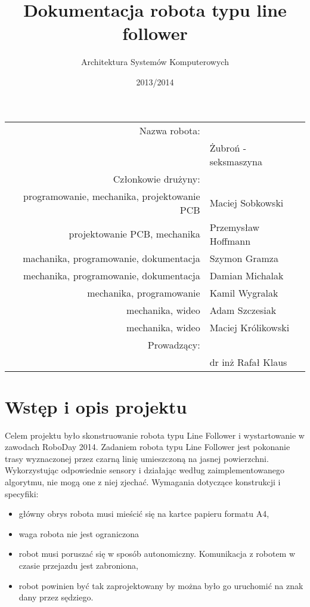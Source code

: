 \documentclass[11pt,a4paper]{article}
\author{Architektura Systemów Komputerowych}
\title{Dokumentacja robota typu line follower}
\date{2013/2014}
\begin{document}
\vspace{3cm}
\maketitle
\vspace{2cm}

\begin{center}
\begin{tabularx}{\linewidth}{rl}
  \hline
  Nazwa robota: & \\
  & Żubroń - seksmaszyna \\
  \hline 
  Członkowie drużyny: & \\
  programowanie, mechanika, projektowanie PCB & Maciej Sobkowski \\
  projektowanie PCB, mechanika & Przemysław Hoffmann \\
  machanika, programowanie, dokumentacja & Szymon Gramza \\
  mechanika, programowanie, dokumentacja & Damian Michalak \\
  mechanika, programowanie & Kamil Wygralak \\
  mechanika, wideo & Adam Szczesiak \\
  mechanika, wideo & Maciej Królikowski \\
  \hline
  Prowadzący: & \\
  & dr inż Rafał Klaus \\
  \hline
\end{tabularx} 
\end{center} %

\newpage
\tableofcontents
\newpage

\section{Wstęp i opis projektu}
Celem projektu było skonstruowanie robota typu Line Follower i wystartowanie w zawodach RoboDay 2014.
Zadaniem robota typu Line Follower jest pokonanie trasy wyznaczonej przez czarną linię umieszczoną na jasnej powierzchni. Wykorzystując odpowiednie sensory i działając według zaimplementowanego algorytmu, nie mogą one z niej zjechać.
Wymagania dotyczące konstrukcji i specyfiki:
\begin{itemize}
  \item główny obrys robota musi mieścić się na kartce papieru formatu A4,
  \item waga robota nie jest ograniczona
  \item robot musi poruszać się w sposób autonomiczny. Komunikacja z robotem w czasie przejazdu jest zabroniona,
  \item robot powinien być tak zaprojektowany by można było go uruchomić na znak dany przez sędziego.
\end{itemize}
\end{document}
